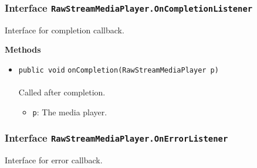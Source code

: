 \subsubsection{Interface \lstinline|RawStreamMediaPlayer.OnCompletionListener|}
Interface for completion callback. \\
\noindent\begin{minipage}[t]{5cm}
\vspace{0.3em}
\hspace*{2em}
\vspace{0.3em}
\end{minipage}





\textbf{\sffamily Methods}
\begin{itemize}
\item \lstinline|public void| \lstinline|onCompletion|\lstinline|(RawStreamMediaPlayer p)|\\ \\[-0.6em]
Called after completion.
\begin{itemize}
\item \lstinline|p|: The media player.
\end{itemize}



\end{itemize}

\subsubsection{Interface \lstinline|RawStreamMediaPlayer.OnErrorListener|}
Interface for error callback. \\
\noindent\begin{minipage}[t]{5cm}
\vspace{0.3em}
\hspace*{2em}
\vspace{0.3em}
\end{minipage}





